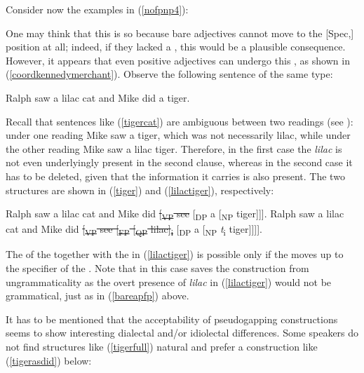Consider now the examples in (\ref{nofpnp4}):

\ea \label{nofpnp4}
 \label{bareapfp}
\z
\z

One may think that this is so because bare adjectives cannot move to the [Spec,] position at all; indeed, if they lacked a , this would be a plausible consequence. However, it appears that even positive adjectives can undergo this , as shown in (\ref{coordkennedymerchant}). Observe the following sentence of the same type:

\ea	Ralph saw a lilac cat and Mike did a tiger. \label{tigercat}
\z

Recall that sentences like (\ref{tigercat}) are ambiguous between two readings (see \citealt[127--131]{kennedymerchant2000}): under one reading Mike saw a tiger, which was not necessarily lilac, while under the other reading Mike saw a lilac tiger. Therefore, in the first case the  \textit{lilac} is not even underlyingly present in the second clause, whereas in the second case it has to be deleted, given that the information it carries is also present. The two structures are shown in (\ref{tiger}) and (\ref{lilactiger}), respectively:

\ea \label{tigerfull}
\ea	Ralph saw a lilac cat and Mike did \sout{[\textsubscript{VP} see} [\textsubscript{DP} a [\textsubscript{NP} tiger]]]. \label{tiger}
\ex	Ralph saw a lilac cat and Mike did \sout{[\textsubscript{VP} see [\textsubscript{FP} [\textsubscript{QP} lilac]\textsubscript{i}} [\textsubscript{DP} a [\textsubscript{NP} \emph{t}\textsubscript{i} tiger]]]]. \label{lilactiger}
\z
\z

The  of the  together with the  in (\ref{lilactiger}) is possible only if the  moves up to the specifier of the . Note that in this case  saves the construction from ungrammaticality as the overt presence of \textit{lilac} in (\ref{lilactiger}) would not be grammatical, just as in (\ref{bareapfp}) above.

It has to be mentioned that the acceptability of pseudogapping constructions seems to show interesting dialectal and/or idiolectal differences. Some speakers do not find structures like (\ref{tigerfull}) natural and prefer a construction like (\ref{tigerasdid}) below:

